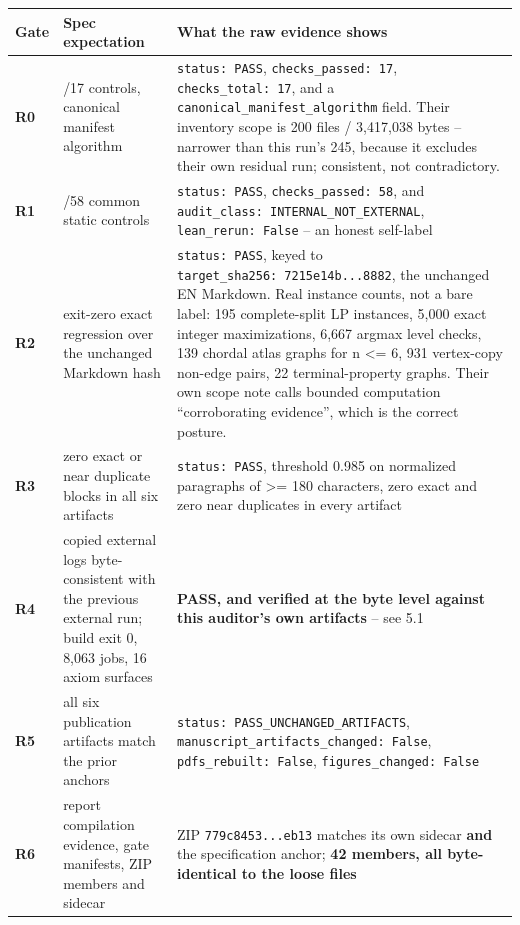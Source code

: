 \documentclass[
  10pt,
]{article}
\newcounter{none} %
\begin{document}
{\def\LTcaptype{none} %
\begin{longtable}[]{@{}
  >{\raggedright\arraybackslash}p{}
  >{\raggedright\arraybackslash}p{}
  >{\raggedright\arraybackslash}p{}@{}}
\toprule\noalign{}
\begin{minipage}[b]{\linewidth}\raggedright
Gate
\end{minipage} & \begin{minipage}[b]{\linewidth}\raggedright
Spec expectation
\end{minipage} & \begin{minipage}[b]{\linewidth}\raggedright
What the raw evidence shows
\end{minipage} \\
\midrule\noalign{}
\endhead
\bottomrule\noalign{}
\endlastfoot
\textbf{R0} & 17/17 controls, canonical manifest algorithm &
\texttt{status:\ PASS}, \texttt{checks\_passed:\ 17},
\texttt{checks\_total:\ 17}, and a
\texttt{canonical\_manifest\_algorithm} field. Their inventory scope is
200 files / 3,417,038 bytes -- narrower than this run's 245, because it
excludes their own residual run; consistent, not contradictory. \\
\textbf{R1} & 58/58 common static controls & \texttt{status:\ PASS},
\texttt{checks\_passed:\ 58}, and
\texttt{audit\_class:\ INTERNAL\_NOT\_EXTERNAL},
\texttt{lean\_rerun:\ False} -- an honest self-label \\
\textbf{R2} & exit-zero exact regression over the unchanged Markdown
hash & \texttt{status:\ PASS}, keyed to
\texttt{target\_sha256:\ 7215e14b...8882}, the unchanged EN Markdown.
Real instance counts, not a bare label: 195 complete-split LP instances,
5,000 exact integer maximizations, 6,667 argmax level checks, 139
chordal atlas graphs for n \textless= 6, 931 vertex-copy non-edge pairs,
22 terminal-property graphs. Their own scope note calls bounded
computation ``corroborating evidence'', which is the correct posture. \\
\textbf{R3} & zero exact or near duplicate blocks in all six artifacts &
\texttt{status:\ PASS}, threshold 0.985 on normalized paragraphs of
\textgreater= 180 characters, zero exact and zero near duplicates in
every artifact \\
\textbf{R4} & copied external logs byte-consistent with the previous
external run; build exit 0, 8,063 jobs, 16 axiom surfaces &
\textbf{PASS, and verified at the byte level against this auditor's own
artifacts} -- see 5.1 \\
\textbf{R5} & all six publication artifacts match the prior anchors &
\texttt{status:\ PASS\_UNCHANGED\_ARTIFACTS},
\texttt{manuscript\_artifacts\_changed:\ False},
\texttt{pdfs\_rebuilt:\ False}, \texttt{figures\_changed:\ False} \\
\textbf{R6} & report compilation evidence, gate manifests, ZIP members
and sidecar & ZIP \texttt{779c8453...eb13} matches its own sidecar
\textbf{and} the specification anchor; \textbf{42 members, all
byte-identical to the loose files} \\
\end{longtable}
}
\end{document}
